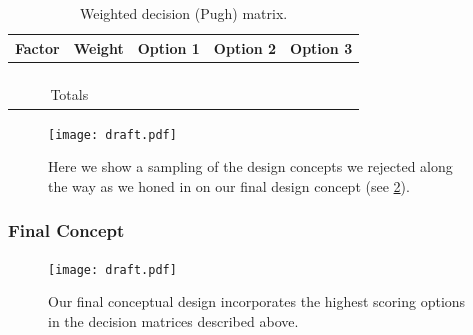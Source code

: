 \documentclass[report]{byu-aero}
\begin{document}
\begin{table}[h!]
	\centering
	\caption{Weighted decision (Pugh) matrix.}
	\label{tab:decisionmatrix1}
	\begin{tabular}{ |c|c|c|c|c| } 
		\hline
		\rowcolor{BYUbluemid}
    	Factor & Weight & Option 1 & Option 2 & Option 3 \\ 
		\hline
	     &  &  &  &  \\ 
		\hline
		 &  &  &  &  \\ 
		\hline
		 &  &  &  &  \\ 
		\hline
		 &  &  &  &  \\ 
		\hline
		\multicolumn{2}{|c|}{Totals} &  &  &  \\ %
		\hline
	\end{tabular}
\end{table}


\begin{figure}[h!]
	\centering
	\texttt{[image: draft.pdf]}
	\caption{Here we show a sampling of the design concepts we rejected along the way as we honed in on our final design concept (see \cref{fig:finalconcept}).}
	\label{fig:rejecteddesigns}
\end{figure}



\subsubsection{Final Concept}
\label{sssec:finalconcept}

\begin{figure}[h!]
	\centering
	\texttt{[image: draft.pdf]}
	\caption{Our final conceptual design incorporates the highest scoring options in the decision matrices described above.}
	\label{fig:finalconcept}
\end{figure}



\end{document}
